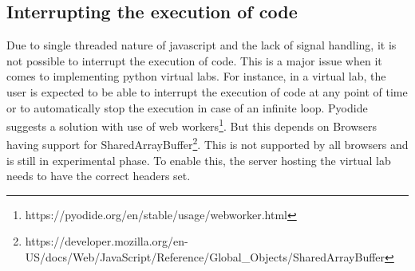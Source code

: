 \subsection*{Interrupting the execution of code}
Due to single threaded nature of javascript and the lack of signal handling, it is not possible to interrupt the execution of code. This is a major issue when it comes to implementing python virtual labs. For instance, in a virtual lab, the user is expected to be able to interrupt the execution of code at any point of time or to automatically stop the execution in case of an infinite loop. Pyodide suggests a solution with use of web workers\footnote{https://pyodide.org/en/stable/usage/webworker.html}. But this depends on Browsers having support for SharedArrayBuffer\footnote{https://developer.mozilla.org/en-US/docs/Web/JavaScript/Reference/Global\_Objects/SharedArrayBuffer}. This is not supported by all browsers and is still in experimental phase. To enable this, the server hosting the virtual lab needs to have the correct headers set. \\

